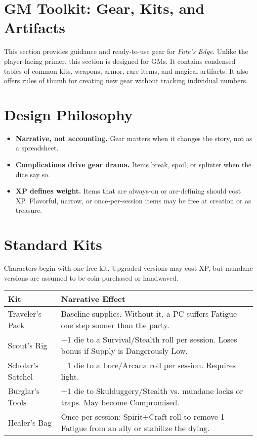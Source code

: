 \documentclass[12pt]{article}
\begin{document}
\section{GM Toolkit: Gear, Kits, and Artifacts}

This section provides guidance and ready-to-use gear for \textit{Fate’s Edge}.  
Unlike the player-facing primer, this section is designed for GMs.  
It contains condensed tables of common kits, weapons, armor, rare items, and magical artifacts.  
It also offers rules of thumb for creating new gear without tracking individual numbers.

\section{Design Philosophy}
\begin{itemize}
  \item \textbf{Narrative, not accounting.} Gear matters when it changes the story, not as a spreadsheet.
  \item \textbf{Complications drive gear drama.} Items break, spoil, or splinter when the dice say so.
  \item \textbf{XP defines weight.} Items that are always-on or arc-defining should cost XP.  
  Flavorful, narrow, or once-per-session items may be free at creation or as treasure.
\end{itemize}

\section{Standard Kits}
Characters begin with one free kit. Upgraded versions may cost XP, but mundane versions are assumed to be coin-purchased or handwaved.

\begin{tabularx}{\textwidth}{lX}
\textbf{Kit} & \textbf{Narrative Effect} \\
\hline
Traveler’s Pack & Baseline supplies. Without it, a PC suffers Fatigue one step sooner than the party. \\
Scout’s Rig & +1 die to a Survival/Stealth roll per session. Loses bonus if Supply is Dangerously Low. \\
Scholar’s Satchel & +1 die to a Lore/Arcana roll per session. Requires light. \\
Burglar’s Tools & +1 die to Skulduggery/Stealth vs. mundane locks or traps. May become Compromised. \\
Healer’s Bag & Once per session: Spirit+Craft roll to remove 1 Fatigue from an ally or stabilize the dying. \\
\end{tabularx}
\end{document}
